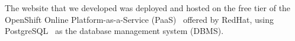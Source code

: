     \begin{figure}[htpb]
    \end{figure}

    The website that we developed was deployed and hosted on the free tier of the OpenShift Online Platform-as-a-Service (PaaS)~\cite{openshift} offered by RedHat, using PostgreSQL~\cite{postgresql} as the database management system (DBMS).